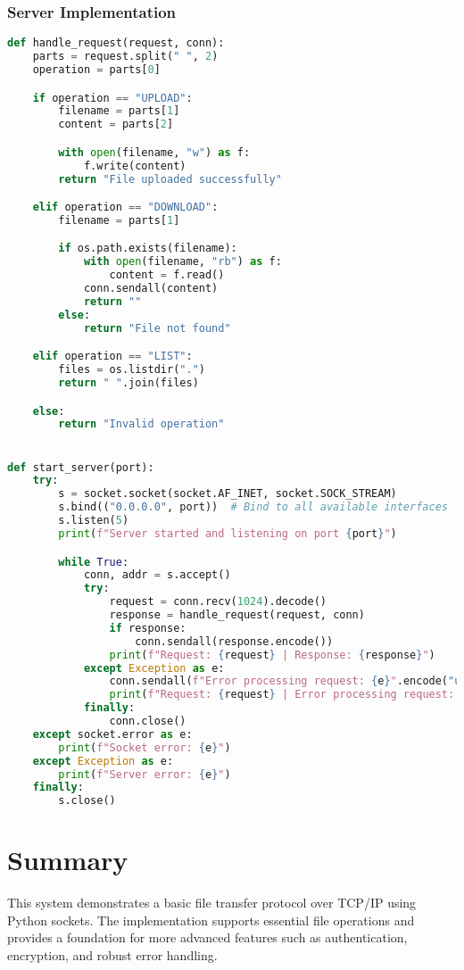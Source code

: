 \documentclass[a4paper,12pt]{article}
\begin{document}
\subsubsection*{Server Implementation}
\begin{lstlisting}[language=Python, caption=Server Implementation, label=lst:server, basicstyle=\ttfamily\footnotesize, keywordstyle=\color{blue}]
def handle_request(request, conn):
    parts = request.split(" ", 2)
    operation = parts[0]

    if operation == "UPLOAD":
        filename = parts[1]
        content = parts[2]

        with open(filename, "w") as f:
            f.write(content)
        return "File uploaded successfully"

    elif operation == "DOWNLOAD":
        filename = parts[1]

        if os.path.exists(filename):
            with open(filename, "rb") as f:
                content = f.read()
            conn.sendall(content)
            return ""
        else:
            return "File not found"

    elif operation == "LIST":
        files = os.listdir(".")
        return " ".join(files)

    else:
        return "Invalid operation"


def start_server(port):
    try:
        s = socket.socket(socket.AF_INET, socket.SOCK_STREAM)
        s.bind(("0.0.0.0", port))  # Bind to all available interfaces
        s.listen(5)
        print(f"Server started and listening on port {port}")

        while True:
            conn, addr = s.accept()
            try:
                request = conn.recv(1024).decode()
                response = handle_request(request, conn)
                if response:
                    conn.sendall(response.encode())
                print(f"Request: {request} | Response: {response}")
            except Exception as e:
                conn.sendall(f"Error processing request: {e}".encode("utf-8"))
                print(f"Request: {request} | Error processing request: {e}")
            finally:
                conn.close()
    except socket.error as e:
        print(f"Socket error: {e}")
    except Exception as e:
        print(f"Server error: {e}")
    finally:
        s.close()
\end{lstlisting}

\section*{Summary}
This system demonstrates a basic file transfer protocol over TCP/IP using Python sockets. The implementation supports essential file operations and provides a foundation for more advanced features such as authentication, encryption, and robust error handling.
\end{document}
